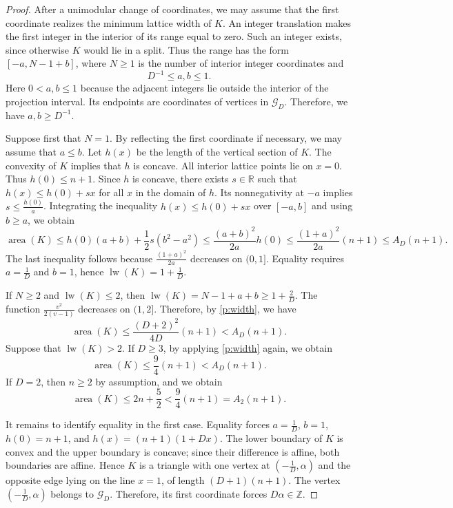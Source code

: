 \documentclass[reqno, 11pt]{article}
\numberwithin{equation}{section}
\theoremstyle{definition}
\newcommand{\Z}{\mathbb Z}
\DeclareMathOperator{\area}{area}
\DeclareMathOperator{\lw}{lw}
\numberwithin{equation}{section}
\begin{document}
\begin{proof} 
After a unimodular change of coordinates, we may assume that the first coordinate realizes the minimum lattice width of \(K\).  An integer translation makes the first integer in the interior of its range equal to zero. Such an integer exists, since otherwise $K$ would lie in a split. Thus the range has the form $[-a,N-1+b]$, where $N\ge1$ is the number of interior integer coordinates and  
\[D^{-1}\le a,b\le1.
\]
Here $0<a,b\le1$ because the adjacent integers lie outside the interior of the projection interval. Its endpoints are coordinates
of vertices in $\mathcal G_D$. Therefore, we have $a,b\ge D^{-1}$.

Suppose first that $N=1$. By reflecting the first coordinate if necessary, we may assume that $a\le b$. Let $h(x)$ be the length of the vertical section of $K$. The convexity of \(K\) implies that \(h\) is concave. All interior lattice points lie on $x=0$. Thus $h(0)\le n+1$. Since $h$ is concave, there exists \(s\in\mathbb R\) such that $h(x)\le h(0)+sx$ for all \(x\) in the domain of \(h\). Its nonnegativity at $-a$ implies $s\le \frac{h(0)}{a}$.
Integrating the inequality $h(x)\le h(0)+sx$ over $[-a,b]$ and using $b\ge a$, we obtain
\[
 \area(K)\le h(0)(a+b)+\frac12s(b^2-a^2)\le\frac{(a+b)^2}{2a}h(0)
 \le\frac{(1+a)^2}{2a}(n+1)\le A_D(n+1).
\]
The last inequality follows because $\frac{(1+a)^2}{2a}$ decreases on $(0,1]$. 
Equality requires $a=\frac{1}{D}$ and $b=1$, hence $\lw(K)=1+\frac{1}{D}$.

If $N\ge2$ and $\lw(K)\le2$, then $\lw(K)=N-1+a+b\ge1+\frac{2}{D}$. The function $\frac{v^2}{2(v-1)}$ decreases
on $(1,2]$. Therefore, by \cref{p:width}, we have
\[
\area(K)\le\frac{(D+2)^2}{4D}(n+1)<A_D(n+1).
\]
Suppose that $\operatorname{lw}(K)>2$.
If $D\ge 3$, by applying \cref{p:width} again, we obtain 
\[
\operatorname{area}(K)\le \frac{9}{4}(n+1) < A_D(n+1).
\]
If $D=2$, then $n\ge 2$ by assumption, and we obtain
\[
\operatorname{area}(K)
\le 2n+\frac{5}{2}
< \frac{9}{4}(n+1)
= A_2(n+1).
\]

It remains to identify equality in the first case. Equality forces
$a=\frac{1}{D}$, $b=1$, $h(0)=n+1$, and $h(x)=(n+1)(1+Dx)$.
The lower boundary of $K$ is convex and the upper boundary is concave; since their difference is affine, both boundaries are affine. Hence \(K\) is a triangle with one vertex at \(\left(-\frac1D,\alpha\right)\) and the opposite edge lying on the line \(x=1\), of length \((D+1)(n+1)\). The vertex $\left(-\frac{1}{D},\alpha\right)$ belongs to $\mathcal G_D$. Therefore, its first coordinate forces $D\alpha\in\Z$.



\end{proof}
\end{document}
